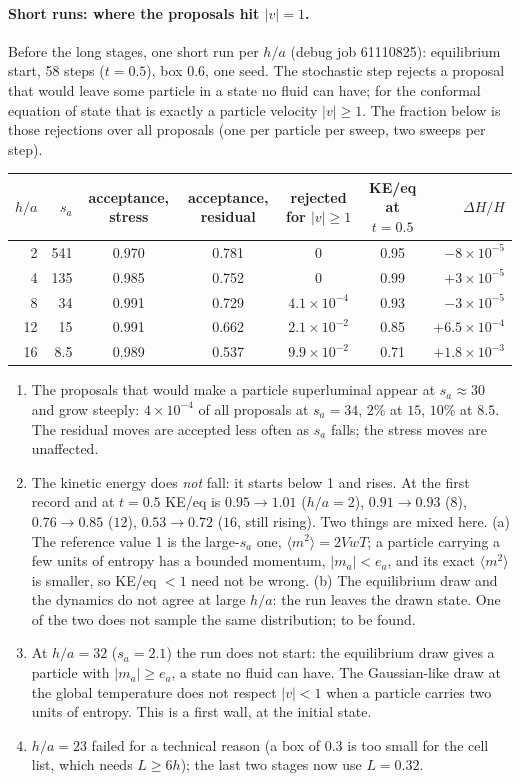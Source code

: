 \documentclass[11pt,aps,preprint,nofootinbib,superscriptaddress,tightenlines]{revtex4-2}
\newcommand{\avg}[1]{\langle #1\rangle}
\let\oldparagraph\paragraph
\renewcommand{\paragraph}{\par\bigskip\oldparagraph}
\begin{document}
\paragraph{Short runs: where the proposals hit $|v|=1$.}  Before the long stages, one short
run per $h/a$ (debug job 61110825): equilibrium start, 58 steps ($t=0.5$), box $0.6$, one
seed.  The stochastic step rejects a proposal that would leave some particle in a state no
fluid can have; for the conformal equation of state that is exactly a particle velocity
$|v|\ge1$.  The fraction below is those rejections over all proposals (one per particle per
sweep, two sweeps per step).
\begin{center}
\begin{tabular}{rrccccr}
\hline
$h/a$ & $s_a$ & acceptance, stress & acceptance, residual & rejected for $|v|\ge1$ & KE/eq at $t=0.5$ & $\Delta H/H$ \\ \hline
2 & 541 & 0.970 & 0.781 & 0 & 0.95 & $-8\times10^{-5}$ \\
4 & 135 & 0.985 & 0.752 & 0 & 0.99 & $+3\times10^{-5}$ \\
8 & 34 & 0.991 & 0.729 & $4.1\times10^{-4}$ & 0.93 & $-3\times10^{-5}$ \\
12 & 15 & 0.991 & 0.662 & $2.1\times10^{-2}$ & 0.85 & $+6.5\times10^{-4}$ \\
16 & 8.5 & 0.989 & 0.537 & $9.9\times10^{-2}$ & 0.71 & $+1.8\times10^{-3}$ \\
\hline
\end{tabular}
\end{center}
\begin{enumerate}
\item The proposals that would make a particle superluminal appear at $s_a\approx30$ and grow
  steeply: $4\times10^{-4}$ of all proposals at $s_a=34$, $2\%$ at $15$, $10\%$ at $8.5$.  The
  residual moves are accepted less often as $s_a$ falls; the stress moves are unaffected.
\item The kinetic energy does \emph{not} fall: it starts below 1 and rises.  At the first record
  and at $t=0.5$ KE/eq is $0.95\to1.01$ ($h/a=2$), $0.91\to0.93$ ($8$), $0.76\to0.85$ ($12$),
  $0.53\to0.72$ ($16$, still rising).  Two things are mixed here.  (a) The reference value 1 is
  the large-$s_a$ one, $\avg{m^2}=2VwT$; a particle carrying a few units of entropy has a bounded
  momentum, $|m_a|<e_a$, and its exact $\avg{m^2}$ is smaller, so KE/eq $<1$ need not be wrong.
  (b) The equilibrium draw and the dynamics do not agree at large $h/a$: the run leaves the
  drawn state.  One of the two does not sample the same distribution; to be found.
\item At $h/a=32$ ($s_a=2.1$) the run does not start: the equilibrium draw gives a particle with
  $|m_a|\ge e_a$, a state no fluid can have.  The Gaussian-like draw at the global temperature
  does not respect $|v|<1$ when a particle carries two units of entropy.  This is a first wall,
  at the initial state.
\item $h/a=23$ failed for a technical reason (a box of $0.3$ is too small for the cell list,
  which needs $L\ge6h$); the last two stages now use $L=0.32$.
\end{enumerate}
\end{document}
